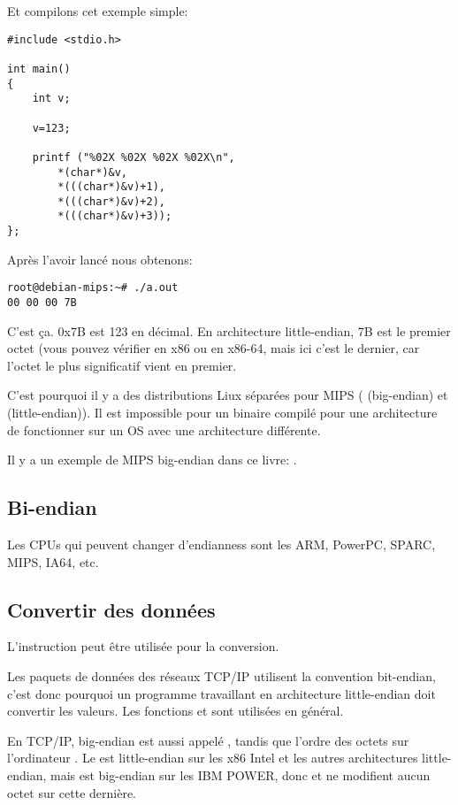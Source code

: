 Et compilons cet exemple simple:

\begin{lstlisting}[style=customc]
#include <stdio.h>

int main()
{
	int v;

	v=123;

	printf ("%02X %02X %02X %02X\n", 
		*(char*)&v,
		*(((char*)&v)+1),
		*(((char*)&v)+2),
		*(((char*)&v)+3));
};
\end{lstlisting}

Après l'avoir lancé nous obtenons:

\begin{lstlisting}
root@debian-mips:~# ./a.out 
00 00 00 7B
\end{lstlisting}

C'est ça.
0x7B est 123 en décimal.
En architecture little-endian, 7B est le premier octet (vous pouvez vérifier en x86
ou en x86-64, mais ici c'est le dernier, car l'octet le plus significatif vient en
premier.

C'est pourquoi il y a des distributions Liux séparées pour MIPS ( (big-endian)
et  (little-endian)).
Il est impossible pour un binaire compilé pour une architecture de fonctionner sur
un \ac{OS} avec une architecture différente.

Il y a un exemple de MIPS big-endian dans ce livre: .

\subsection{Bi-endian}

Les CPUs qui peuvent changer d'endianness sont les ARM, PowerPC, SPARC, MIPS, \ac{IA64}, etc.

\subsection{Convertir des données}

L'instruction  peut être utilisée pour la conversion.

Les paquets de données des réseaux TCP/IP utilisent la convention bit-endian, c'est
donc pourquoi un programme travaillant en architecture little-endian doit convertir
les valeurs.
Les fonctions  et  sont utilisées en général.

En TCP/IP, big-endian est aussi appelé , tandis que l'ordre
des octets sur l'ordinateur .
Le  est little-endian sur les x86 Intel et les autres architectures
little-endian, mais est big-endian sur les IBM POWER, donc  et 
ne modifient aucun octet sur cette dernière.

